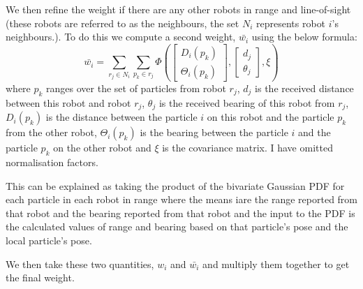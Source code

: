 \documentclass[10pt,a4paper]{article}
\begin{document}
We then refine the weight if there are any other robots in range and line-of-sight (these robots are referred to as the neighbours, the set $N_i$ represents robot $i$'s neighbours.). To do this we compute a second weight, $\bar{w_i}$ using the below formula:
\[
	\bar{w_i} = \sum_{r_j \in N_i}\sum_{p_k \in r_j}\Phi\left(
	\begin{bmatrix}
		D_i(p_k)\\
		\Theta_i(p_k)
	\end{bmatrix},
	\begin{bmatrix}
		d_j\\
		\theta_j
	\end{bmatrix},
	\xi
	\right)
\]
where $p_k$ ranges over the set of particles from robot $r_j$, $d_j$ is the received distance between this robot and robot $r_j$, $\theta_j$ is the received bearing of this robot from $r_j$, $D_i(p_k)$ is the distance between the particle $i$ on this robot and the particle $p_k$ from the other robot, $\Theta_i(p_k)$ is the bearing between the particle $i$ and the particle $p_k$ on the other robot and $\xi$ is the covariance matrix. I have omitted normalisation factors.

This can be explained as taking the product of the bivariate Gaussian PDF for each particle in each robot in range where the means iare the range reported from that robot and the bearing reported from that robot and the input to the PDF is the calculated values of range and bearing based on that particle's pose and the local particle's pose.

We then take these two quantities, $w_i$ and $\bar{w_i}$ and multiply them together to get the final weight.
\end{document}
